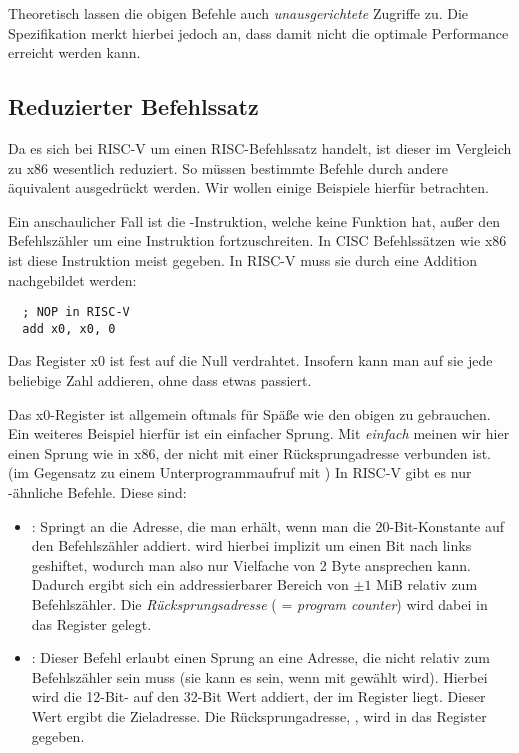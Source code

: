 Theoretisch lassen die obigen Befehle auch \emph{unausgerichtete}
Zugriffe zu. Die Spezifikation merkt hierbei jedoch an,
dass damit nicht die optimale Performance erreicht werden kann.

\subsection{Reduzierter Befehlssatz}

Da es sich bei RISC-V um einen RISC-Befehlssatz handelt, ist dieser im Vergleich
zu x86 wesentlich reduziert. So müssen bestimmte Befehle durch andere äquivalent
ausgedrückt werden. Wir wollen einige Beispiele hierfür betrachten.

Ein anschaulicher Fall ist die -Instruktion, welche keine Funktion
hat, außer den Befehlszähler um eine Instruktion fortzuschreiten. In CISC
Befehlssätzen wie x86 ist diese Instruktion meist gegeben. In RISC-V muss sie
durch eine Addition nachgebildet werden:

\begin{lstlisting}
  ; NOP in RISC-V
  add x0, x0, 0
\end{lstlisting}

Das Register x0 ist fest auf die Null verdrahtet. Insofern kann man auf sie
jede beliebige Zahl addieren, ohne dass etwas passiert.

Das x0-Register ist allgemein oftmals für Späße wie den obigen zu gebrauchen. Ein
weiteres Beispiel hierfür ist ein einfacher Sprung. Mit \emph{einfach} meinen
wir hier einen Sprung wie  in x86, der nicht mit einer
Rücksprungadresse verbunden ist. (im Gegensatz zu einem Unterprogrammaufruf mit
) In RISC-V gibt es nur -ähnliche Befehle. Diese sind:

\begin{itemize}
  \item {}: Springt an die Adresse, die man
    erhält, wenn man die 20-Bit-Konstante  auf den Befehlszähler
    addiert.  wird hierbei implizit um einen Bit nach links
    geshiftet, wodurch man also nur Vielfache von 2 Byte ansprechen
    kann. Dadurch ergibt sich ein addressierbarer Bereich von $\pm 1$ MiB
    relativ zum Befehlszähler. Die \emph{Rücksprungsadresse} 
    ( = \emph{program counter}) wird dabei in das Register
     gelegt.
 \item {}: Dieser Befehl erlaubt einen Sprung an eine Adresse, die nicht relativ zum Befehlszähler sein muss (sie
   kann es sein, wenn  mit  gewählt wird). Hierbei wird
   die 12-Bit- auf den 32-Bit Wert addiert, der im Register
    liegt. Dieser Wert ergibt die Zieladresse. Die
   Rücksprungadresse, , wird in das Register 
   gegeben.
\end{itemize}

